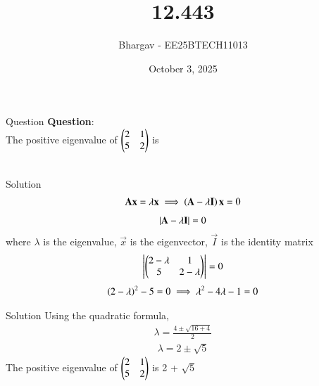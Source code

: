 \documentclass{beamer}
\title{12.443}
\date{October 3, 2025}
\author{Bhargav - EE25BTECH11013}
\begin{document}
\frame{\titlepage}

\begin{frame}{Question}
\textbf{Question}: \\
The positive eigenvalue of $\begin{pmatrix}2 & 1 \\ 5 & 2\end{pmatrix}$
is \\ \\
\end{frame}


\begin{frame}{Solution}
\begin{align}
\mathbf{A}\mathbf{x} = \lambda \mathbf{x} \implies \left(\mathbf{A}-\lambda\mathbf{I}\right)\mathbf{x} = 0
\end{align}
\begin{align}
\left\vert\mathbf{A} - \lambda\mathbf{I}\right\vert = 0    
\end{align}
 where $\lambda$ is the eigenvalue, $\vec{x}$ is the eigenvector, $\vec{I}$ is the identity matrix
\begin{align}
\left\vert\begin{pmatrix}2-\lambda & 1 \\ 5 & 2-\lambda\end{pmatrix}\right\vert = 0 
\end{align}
\begin{align}
\left(2-\lambda\right)^2 - 5 = 0 \implies \lambda^2 - 4\lambda - 1 = 0
\end{align}
\end{frame}

\begin{frame}{Solution}
Using the quadratic formula, 
\begin{align}
\lambda = \frac{4 \pm \sqrt{16 + 4}}{2}
\end{align}
\begin{align}
\lambda = 2 \pm \sqrt{5}
\end{align}
The positive eigenvalue of $\begin{pmatrix}2 & 1 \\ 5 & 2\end{pmatrix}$ is 2 + $\sqrt{5}$
\end{frame}
\end{document}
